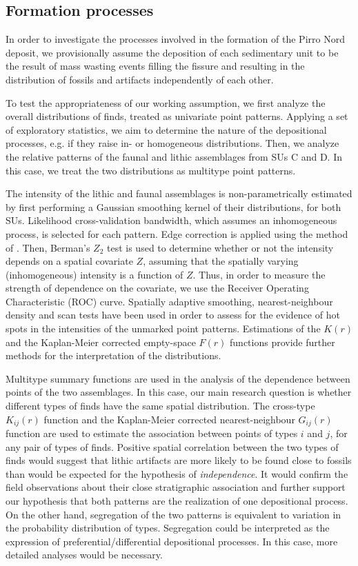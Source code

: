 \documentclass[review,authoryear]{elsarticle} %
\begin{document}
\subsection{Formation processes}

In order to investigate the processes involved in the formation of the Pirro Nord deposit, we provisionally assume the deposition of each sedimentary unit to be the result of mass wasting events filling the fissure and resulting in the distribution of fossils and artifacts independently of each other.

To test the appropriateness of our working assumption, we first analyze the overall distributions of finds, treated as univariate point patterns. Applying a set of exploratory statistics, we aim to determine the nature of the depositional processes, e.g. if they raise in- or homogeneous distributions. Then, we analyze the relative patterns of the faunal and lithic assemblages from SUs C and D. In this case, we treat the two distributions as multitype point patterns.

The intensity of the lithic and faunal assemblages is non-parametrically estimated by first performing a Gaussian smoothing kernel of their distributions, for both SUs. Likelihood cross-validation bandwidth, which assumes an inhomogeneous process, is selected for each pattern. Edge correction is applied using the method of \cite{Diggle1985}. Then, Berman's $Z_2$ test is used to determine whether or not the intensity depends on a spatial covariate $Z$, assuming that the spatially varying (inhomogeneous) intensity is a function of $Z$. Thus, in order to measure the strength of dependence on the covariate, we use the Receiver Operating Characteristic (ROC) curve. Spatially adaptive smoothing, nearest-neighbour density and scan tests have been used in order to assess for the evidence of hot spots in the intensities of the unmarked point patterns. Estimations of the $K(r)$ and the Kaplan-Meier corrected empty-space $F(r)$ functions provide further methods for the interpretation of the distributions.

Multitype summary functions are used in the analysis of the dependence between points of the two assemblages. In this case, our main research question is whether different types of finds have the same spatial distribution. The cross-type $K_{ij}(r)$ function and the Kaplan-Meier corrected nearest-neighbour $G_{ij}(r)$ function are used to estimate the association between points of types $i$ and $j$, for any pair of types of finds. Positive spatial correlation between the two types of finds would suggest that lithic artifacts are more likely to be found close to fossils than would be expected for the hypothesis of \emph{independence}. It would confirm the field observations about their close stratigraphic association and further support our hypothesis that both patterns are the realization of one depositional process. On the other hand, segregation of the two patterns is equivalent to variation in the probability distribution of types. Segregation could be interpreted as the expression of preferential/differential depositional processes. In this case, more detailed analyses would be necessary.
\end{document}
